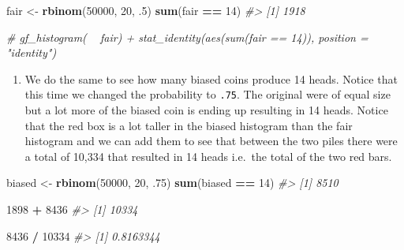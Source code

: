 \documentclass[]{article}
\newenvironment{Shaded}{\begin{snugshade}}{\end{snugshade}}
\newcommand{\CommentTok}[1]{\textcolor[rgb]{0.56,0.35,0.01}{\textit{#1}}}
\newcommand{\DecValTok}[1]{\textcolor[rgb]{0.00,0.00,0.81}{#1}}
\newcommand{\FloatTok}[1]{\textcolor[rgb]{0.00,0.00,0.81}{#1}}
\newcommand{\KeywordTok}[1]{\textcolor[rgb]{0.13,0.29,0.53}{\textbf{#1}}}
\newcommand{\NormalTok}[1]{#1}
\newcommand{\OperatorTok}[1]{\textcolor[rgb]{0.81,0.36,0.00}{\textbf{#1}}}
\newcommand{\StringTok}[1]{\textcolor[rgb]{0.31,0.60,0.02}{#1}}
\providecommand{\tightlist}{%
  \setlength{\itemsep}{0pt}\setlength{\parskip}{0pt}}
\begin{document}
\begin{Shaded}
\begin{Highlighting}[]
\NormalTok{fair <-}\StringTok{ }\KeywordTok{rbinom}\NormalTok{(}\DecValTok{50000}\NormalTok{, }\DecValTok{20}\NormalTok{, }\FloatTok{.5}\NormalTok{)}
\KeywordTok{sum}\NormalTok{(fair }\OperatorTok{==}\StringTok{ }\DecValTok{14}\NormalTok{)}
\CommentTok{#> [1] 1918}
\end{Highlighting}
\end{Shaded}

\begin{Shaded}
\begin{Highlighting}[]
\CommentTok{# gf_histogram( ~ fair) + stat_identity(aes(sum(fair == 14)), position = "identity")}
\end{Highlighting}
\end{Shaded}

\begin{enumerate}
\def\labelenumi{\arabic{enumi}.}
\setcounter{enumi}{1}
\tightlist
\item
  We do the same to see how many biased coins produce 14 heads. Notice
  that this time we changed the probability to \texttt{.75}. The
  original were of equal size but a lot more of the biased coin is
  ending up resulting in 14 heads. Notice that the red box is a lot
  taller in the biased histogram than the fair histogram and we can add
  them to see that between the two piles there were a total of 10,334
  that resulted in 14 heads i.e.~the total of the two red bars.
\end{enumerate}

\begin{Shaded}
\begin{Highlighting}[]
\NormalTok{biased <-}\StringTok{ }\KeywordTok{rbinom}\NormalTok{(}\DecValTok{50000}\NormalTok{, }\DecValTok{20}\NormalTok{, }\FloatTok{.75}\NormalTok{)}
\KeywordTok{sum}\NormalTok{(biased }\OperatorTok{==}\StringTok{ }\DecValTok{14}\NormalTok{)}
\CommentTok{#> [1] 8510}
\end{Highlighting}
\end{Shaded}

\begin{Shaded}
\begin{Highlighting}[]
\DecValTok{1898} \OperatorTok{+}\StringTok{ }\DecValTok{8436}
\CommentTok{#> [1] 10334}

\DecValTok{8436} \OperatorTok{/}\StringTok{ }\DecValTok{10334}
\CommentTok{#> [1] 0.8163344}
\end{Highlighting}
\end{Shaded}
\end{document}
